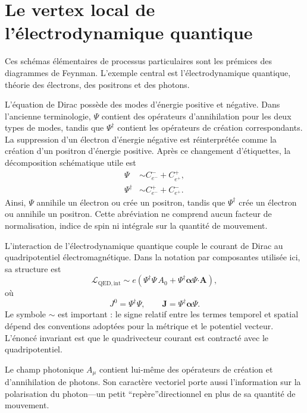 \section{Le vertex local de l’électrodynamique quantique}

Ces schémas élémentaires de processus particulaires sont les prémices des diagrammes de Feynman. L’exemple central est l’électrodynamique quantique, théorie des électrons, des positrons et des photons.

L’équation de Dirac possède des modes d’énergie positive et négative. Dans l’ancienne terminologie, \(\Psi\) contient des opérateurs d’annihilation pour les deux types de modes, tandis que \(\Psi^\dagger\) contient les opérateurs de création correspondants. La suppression d’un électron d’énergie négative est réinterprétée comme la création d’un positron d’énergie positive. Après ce changement d’étiquettes, la décomposition schématique utile est
\begin{align}
\Psi
&\sim
C^-_{e^-}+C^+_{e^+},
\\
\Psi^\dagger
&\sim
C^+_{e^-}+C^-_{e^+}.
\end{align}
Ainsi, \(\Psi\) annihile un électron ou crée un positron, tandis que \(\Psi^\dagger\) crée un électron ou annihile un positron. Cette abréviation ne comprend aucun facteur de normalisation, indice de spin ni intégrale sur la quantité de mouvement.

L’interaction de l’électrodynamique quantique couple le courant de Dirac au quadripotentiel électromagnétique. Dans la notation par composantes utilisée ici, sa structure est
\begin{equation}
\mathcal L_{\mathrm{QED,int}}
\sim
e\left(
\Psi^\dagger\Psi\,A_0
+
\Psi^\dagger\boldsymbol{\alpha}\Psi\mathbin{\boldsymbol{\cdot}}\mathbf A
\right),
\end{equation}
où
\begin{equation}
J^0=\Psi^\dagger\Psi,
\qquad
\mathbf J=\Psi^\dagger\boldsymbol{\alpha}\Psi.
\end{equation}
Le symbole \(\sim\) est important : le signe relatif entre les termes temporel et spatial dépend des conventions adoptées pour la métrique et le potentiel vecteur. L’énoncé invariant est que le quadrivecteur courant est contracté avec le quadripotentiel.

Le champ photonique \(A_\mu\) contient lui-même des opérateurs de création et d’annihilation de photons. Son caractère vectoriel porte aussi l’information sur la polarisation du photon---un petit ``repère''directionnel en plus de sa quantité de mouvement.

